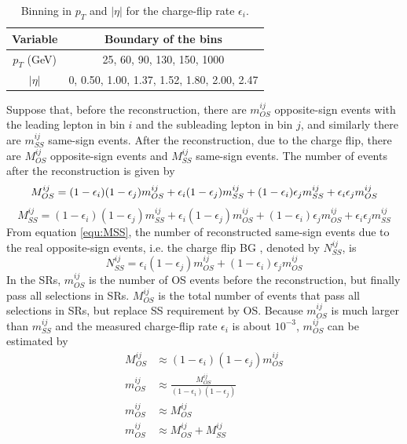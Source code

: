 \begin{table}[htbp]
\centering
\begin{tabular}{|c|c|}
\hline
Variable & Boundary of the bins \\
\hline
$p_T$ (GeV) &  25, 60, 90, 130, 150, 1000 \\
\hline
$|\eta|$ & 0, 0.50, 1.00, 1.37, 1.52, 1.80, 2.00, 2.47 \\
\hline
\end{tabular}
\caption{Binning in $p_T$ and $|\eta|$ for the charge-flip rate $\epsilon_i$.}
\label{table:binning}
\end{table}

Suppose that, before the reconstruction, there are $m^{ij}_{OS}$ opposite-sign events with the leading lepton in bin $i$ and the subleading lepton in bin $j$, and similarly there are $m^{ij}_{SS}$ same-sign events.
After the reconstruction, due to the charge flip, there are $M^{ij}_{OS}$ opposite-sign events and $M^{ij}_{SS}$ same-sign events.
The number of events after the reconstruction is given by
\begin{equation}
M^{ij}_{OS} = (1-\epsilon_i) (1-\epsilon_j) m^{ij}_{OS} + \epsilon_i (1-\epsilon_j) m^{ij}_{SS} + (1-\epsilon_i) \epsilon_j m^{ij}_{SS} + \epsilon_i \epsilon_j m^{ij}_{OS} \\
\end{equation}
\begin{equation}
M^{ij}_{SS} = (1-\epsilon_i) (1-\epsilon_j) m^{ij}_{SS} + \epsilon_i (1-\epsilon_j) m^{ij}_{OS} + (1-\epsilon_i) \epsilon_j m^{ij}_{OS} + \epsilon_i \epsilon_j m^{ij}_{SS}
\label{equ:MSS}
\end{equation}
From equation \ref{equ:MSS}, the number of reconstructed same-sign events due to the real opposite-sign events, i.e. the charge flip BG , denoted by $N^{ij}_{SS}$, is
\begin{equation}
N^{ij}_{SS} = \epsilon_i (1-\epsilon_j) m^{ij}_{OS} + (1-\epsilon_i) \epsilon_j m^{ij}_{OS}
\label{equ:NSS}
\end{equation}
In the SRs, $m^{ij}_{OS}$ is the number of OS events before the reconstruction, but finally pass all selections in SRs.
$M^{ij}_{OS}$ is the total number of events that pass all selections in SRs, but replace SS requirement by OS.
Because $m^{ij}_{OS}$ is much larger than $m^{ij}_{SS}$ and the measured charge-flip rate $\epsilon_i$ is about $10^{-3}$, $m^{ij}_{OS}$ can be estimated by
\begin{align}
M^{ij}_{OS} &\approx (1-\epsilon_i) (1-\epsilon_j) m^{ij}_{OS} \\
m^{ij}_{OS} &\approx \frac{ M^{ij}_{OS} }{ (1-\epsilon_i) (1-\epsilon_j) } \\
m^{ij}_{OS} &\approx M^{ij}_{OS} \\
m^{ij}_{OS} &\approx M^{ij}_{OS} + M^{ij}_{SS}
\label{equ:mapp2}
\end{align}
